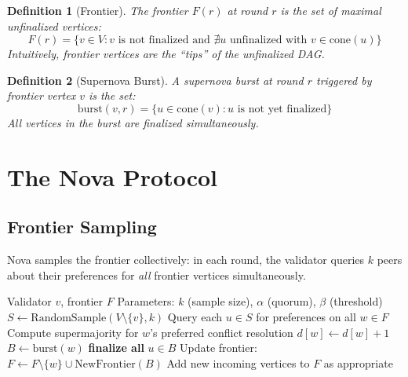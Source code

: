 \documentclass[11pt,a4paper]{article}
\newtheorem{definition}{Definition}[section]
\begin{document}
\begin{definition}[Frontier]
The frontier $F(r)$ at round $r$ is the set of maximal unfinalized vertices:
\[
F(r) = \{v \in V : v \text{ is not finalized and } \nexists u \text{ unfinalized with } v \in \text{cone}(u)\}
\]
Intuitively, frontier vertices are the ``tips'' of the unfinalized DAG.
\end{definition}

\begin{definition}[Supernova Burst]
A supernova burst at round $r$ triggered by frontier vertex $v$ is the set:
\[
\text{burst}(v, r) = \{u \in \text{cone}(v) : u \text{ is not yet finalized}\}
\]
All vertices in the burst are finalized simultaneously.
\end{definition}

\section{The Nova Protocol}
\label{sec:protocol}

\subsection{Frontier Sampling}

Nova samples the frontier collectively: in each round, the validator queries $k$ peers
about their preferences for \emph{all} frontier vertices simultaneously.

\begin{algorithm}[H]
\caption{Nova Protocol --- Frontier-Based Burst Finalization}
\label{alg:nova-core}
\begin{algorithmic}[1]
\Require Validator $v$, frontier $F$
\Require Parameters: $k$ (sample size), $\alpha$ (quorum), $\beta$ (threshold)
    \State $S \gets \text{RandomSample}(V \setminus \{v\}, k)$
    \State Query each $u \in S$ for preferences on all $w \in F$
        \State Compute supermajority for $w$'s preferred conflict resolution
            \State $d[w] \gets d[w] + 1$
        \EndIf
            \State $B \gets \text{burst}(w)$ 
            \State \textbf{finalize all} $u \in B$ 
            \State Update frontier: $F \gets F \setminus \{w\} \cup \text{NewFrontier}(B)$
        \EndIf
    \EndFor
    \State Add new incoming vertices to $F$ as appropriate
\EndWhile
\end{algorithmic}
\end{algorithm}
\end{document}
